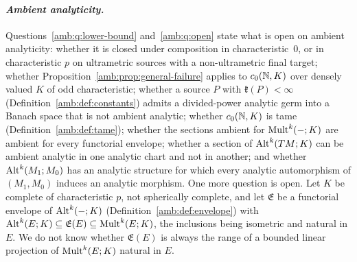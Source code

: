 \paragraph{\textit{Ambient analyticity.}}
Questions~\ref{amb:q:lower-bound} and~\ref{amb:q:open} state what is open on ambient analyticity:
whether it is closed under composition in characteristic~$0$, or in characteristic $p$ on ultrametric sources with a
non-ultrametric final target; whether Proposition~\ref{amb:prop:general-failure} applies to $c_0(\mathbb N,K)$ over densely valued
$K$ of odd characteristic; whether a source $P$ with $\mathfrak k(P)<\infty$ (Definition~\ref{amb:def:constants}) admits a
divided-power analytic germ into a Banach space that is not ambient analytic; whether $c_0(\mathbb N,K)$ is tame
(Definition~\ref{amb:def:tame}); whether the sections ambient for $\operatorname{Mult}^k(-;K)$ are ambient for every functorial envelope;
whether a section of $\operatorname{Alt}^k(TM;K)$ can be ambient analytic in one analytic chart and not in another;
and whether $\operatorname{Alt}^k(M_1;M_0)$ has an analytic structure for which every analytic automorphism of $(M_1,M_0)$ induces an
analytic morphism. One more question is open. Let $K$ be complete of characteristic $p$, not spherically complete, and let $\mathfrak E$ be a functorial
envelope of $\operatorname{Alt}^k(-;K)$ (Definition~\ref{amb:def:envelope}) with $\operatorname{Alt}^k(E;K)\subseteq\mathfrak E(E)\subseteq\operatorname{Mult}^k(E;K)$,
the inclusions being isometric and natural in $E$. We do not know whether $\mathfrak E(E)$ is always the range of a bounded
linear projection of $\operatorname{Mult}^k(E;K)$ natural in $E$.
